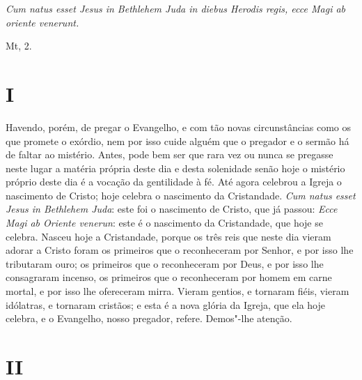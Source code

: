 \epigraph{\emph{Cum natus esset Jesus in Bethlehem Juda in diebus Herodis regis,
ecce Magi ab oriente venerunt.\footnotemark}}{Mt, 2.}

\section*{I}

\noindent{}

Havendo, porém, de pregar o Evangelho, e com tão novas circunstâncias
como os que promete o exórdio, nem por isso cuide alguém que o pregador
e o sermão há de faltar ao mistério. Antes, pode bem ser que rara vez ou
nunca se pregasse neste lugar a matéria própria deste dia e desta
solenidade senão hoje o mistério próprio deste dia é a vocação da
gentilidade à fé. Até agora celebrou a Igreja o nascimento de Cristo;
hoje celebra o nascimento da Cristandade. \emph{Cum natus esset Jesus in
Bethlehem Juda}: este foi o nascimento de
Cristo, que já passou: \emph{Ecce Magi ab Oriente venerun}:
 este é o nascimento da Cristandade, que hoje se
celebra. Nasceu hoje a Cristandade, porque os três reis que neste dia
vieram adorar a Cristo foram os primeiros que o reconheceram por Senhor,
e por isso lhe tributaram ouro; os primeiros que o reconheceram por
Deus, e por isso lhe consagraram incenso, os primeiros que o
reconheceram por homem em carne mortal, e por isso lhe ofereceram mirra.
Vieram gentios, e tornaram fiéis, vieram idólatras, e tornaram cristãos;
e esta é a nova glória da Igreja, que ela hoje celebra, e o Evangelho,
nosso pregador, refere. Demos"-lhe atenção.

\section*{II}

